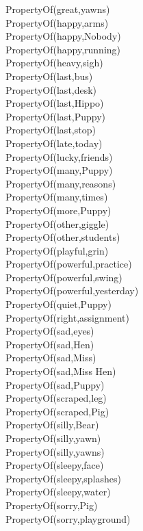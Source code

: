 \begin{multicols}{2}
\begin{footnotesize}
PropertyOf(great,yawns) \\
PropertyOf(happy,arms) \\
PropertyOf(happy,Nobody) \\
PropertyOf(happy,running) \\
PropertyOf(heavy,sigh) \\
PropertyOf(last,bus) \\
PropertyOf(last,desk) \\
PropertyOf(last,Hippo) \\
PropertyOf(last,Puppy) \\
PropertyOf(last,stop) \\
PropertyOf(late,today) \\
PropertyOf(lucky,friends) \\
PropertyOf(many,Puppy) \\
PropertyOf(many,reasons) \\
PropertyOf(many,times) \\
PropertyOf(more,Puppy) \\
PropertyOf(other,giggle) \\
PropertyOf(other,students) \\
PropertyOf(playful,grin) \\
PropertyOf(powerful,practice) \\
PropertyOf(powerful,swing) \\
PropertyOf(powerful,yesterday) \\
PropertyOf(quiet,Puppy) \\
PropertyOf(right,assignment) \\
PropertyOf(sad,eyes) \\
PropertyOf(sad,Hen) \\
PropertyOf(sad,Miss) \\
PropertyOf(sad,Miss Hen) \\
PropertyOf(sad,Puppy) \\
PropertyOf(scraped,leg) \\
PropertyOf(scraped,Pig) \\
PropertyOf(silly,Bear) \\
PropertyOf(silly,yawn) \\
PropertyOf(silly,yawns) \\
PropertyOf(sleepy,face) \\
PropertyOf(sleepy,splashes) \\
PropertyOf(sleepy,water) \\
PropertyOf(sorry,Pig) \\
PropertyOf(sorry,playground) \\

\end{footnotesize}
\end{multicols}
